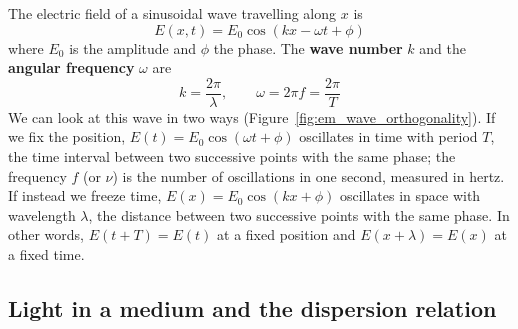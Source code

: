 \documentclass[letterpaper,11pt,leqno]{book}
\begin{document}
The electric field of a sinusoidal wave travelling along $x$ is
\begin{equation}
\boxed{E(x,t) = E_0 \cos(kx - \omega t + \phi)}
\label{eq:wave_harmonics}
\end{equation}
where $E_0$ is the amplitude and $\phi$ the phase. The \textbf{wave number} $k$ and the \textbf{angular frequency} $\omega$ are
\begin{equation}
\boxed{k = \frac{2\pi}{\lambda}, \qquad \omega = 2\pi f = \frac{2\pi}{T}}
\label{eq:wavenumber_eq}
\end{equation}
We can look at this wave in two ways (Figure~\ref{fig:em_wave_orthogonality}). If we fix the position, $E(t) = E_0\cos(\omega t + \phi)$ oscillates in time with period $T$, the time interval between two successive points with the same phase; the frequency $f$ (or $\nu$) is the number of oscillations in one second, measured in hertz. If instead we freeze time, $E(x) = E_0\cos(kx + \phi)$ oscillates in space with wavelength $\lambda$, the distance between two successive points with the same phase. In other words, $E(t + T) = E(t)$ at a fixed position and $E(x + \lambda) = E(x)$ at a fixed time.

\subsection{Light in a medium and the dispersion relation}
\end{document}
